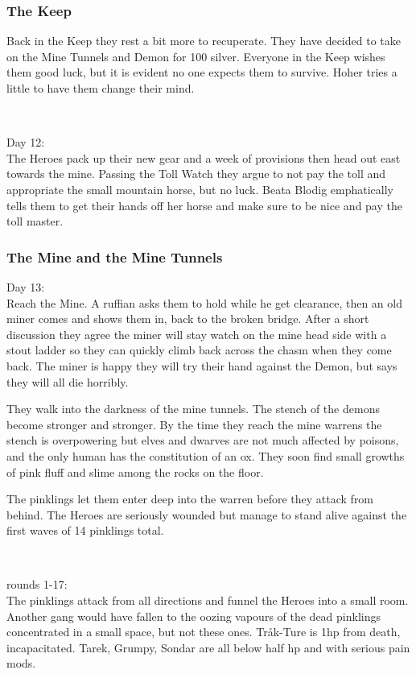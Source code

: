 \subsubsection*{The Keep}
Back in the Keep they rest a bit more to recuperate. They have decided to take on the Mine Tunnels and Demon for 100 silver. Everyone in the Keep wishes them good luck, but it is evident no one expects them to survive. Hoher tries a little to have them change their mind.

\

Day 12:\\
The Heroes pack up their new gear and a week of provisions then head out east towards the mine. Passing the Toll Watch they argue to not pay the toll and appropriate the small mountain horse, but no luck. Beata Blodig emphatically tells them to get their hands off her horse and make sure to be nice and pay the toll master.


\subsubsection*{The Mine and the Mine Tunnels}
\forceindent Day 13:\\
Reach the Mine. A ruffian asks them to hold while he get clearance, then an old miner comes and shows them in, back to the broken bridge. After a short discussion they agree the miner will stay watch on the mine head side with a stout ladder so they can quickly climb back across the chasm when they come back. The miner is happy they will try their hand against the Demon, but says they will all die horribly.

They walk into the darkness of the mine tunnels. The stench of the demons become stronger and stronger. By the time they reach the mine warrens the stench is overpowering but elves and dwarves are not much affected by poisons, and the only human has the constitution of an ox. They soon find small growths of pink fluff and slime among the rocks on the floor.

The pinklings let them enter deep into the warren before they attack from behind. The Heroes are seriously wounded but manage to stand alive against the first waves of 14 pinklings total.

\

rounds 1-17:\\
The pinklings attack from all directions and funnel the Heroes into a small room. Another gang would have fallen to the oozing vapours of the dead pinklings concentrated in a small space, but not these ones. Tråk-Ture is 1hp from death, incapacitated. Tarek, Grumpy, Sondar are all below half hp and with serious pain mods.

